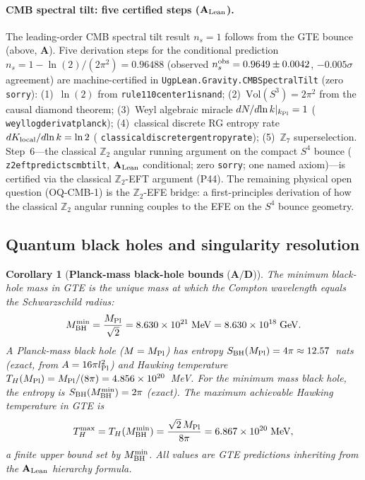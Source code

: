 \documentclass[11pt]{article}
\newtheorem{corollary}[theorem]{Corollary}
\theoremstyle{remark}
\newcommand{\ZS}{\mathbb{Z}_7}
\newcommand{\lean}[1]{%
  \penalty-100
  \begingroup\def\_{\textunderscore\allowbreak}\texttt{#1}\endgroup}
\newcommand{\CatA}{\textbf{A}}
\newcommand{\CatAL}{\ensuremath{\textbf{A}_{\rm Lean}}}
\newcommand{\CatAD}{\textbf{A/D}}
\begin{document}
\paragraph{CMB spectral tilt: five certified steps ($\CatAL$).}
The leading-order CMB spectral tilt result $n_s = 1$ follows from the GTE
bounce (above, $\CatA$).  Five derivation steps for the conditional prediction
$n_s = 1 - \ln(2)/(2\pi^2) = 0.96488$ (observed $n_s^{\rm obs}=0.9649\pm0.0042$,
$-0.005\sigma$ agreement) are machine-certified in
\lean{UgpLean.Gravity.CMBSpectralTilt} (zero \texttt{sorry}):
(1)~$\ln(2)$ from \lean{rule110\_center1\_is\_nand};
(2)~$\mathrm{Vol}(S^3)=2\pi^2$ from the causal diamond theorem;
(3)~Weyl algebraic miracle $dN/d\!\ln k|_{k_{\rm Pl}}=1$
(\lean{weyl\_log\_deriv\_at\_planck});
(4)~classical discrete RG entropy rate $dK_{\rm local}/d\!\ln k = \ln 2$
(\lean{classical\_discrete\_rg\_entropy\_rate});
(5)~$\ZS$ superselection.
Step~6---the classical $\mathbb{Z}_2$ angular running argument on the compact
$S^4$ bounce (\lean{z2\_eft\_predicts\_cmb\_tilt}, $\CatAL$ conditional;
zero \texttt{sorry}; one named axiom)---is certified via the classical
$\mathbb{Z}_2$-EFT argument (P44).  The remaining physical open question
(OQ-CMB-1) is the $\mathbb{Z}_2$-EFE bridge: a first-principles derivation
of how the classical $\mathbb{Z}_2$ angular running couples to the EFE on
the $S^4$ bounce geometry.


\subsection{Quantum black holes and singularity resolution}

\begin{corollary}[\textbf{Planck-mass black-hole bounds} ($\CatAD$)]
\label{cor:planck_bh}
The minimum black-hole mass in GTE is the unique mass at which the Compton
wavelength equals the Schwarzschild radius:
\begin{equation}
  M_{\rm BH}^{\rm min}
  = \frac{M_{\rm Pl}}{\sqrt{2}}
  = 8.630\times10^{21}\;\text{MeV} = 8.630\times10^{18}\;\text{GeV}.
  \label{eq:mbh_min}
\end{equation}
A Planck-mass black hole ($M=M_{\rm Pl}$) has entropy $S_{\rm BH}(M_{\rm
Pl})=4\pi\approx12.57$~nats (exact, from $A=16\pi l_{\rm Pl}^2$) and
Hawking temperature $T_H(M_{\rm Pl})=M_{\rm Pl}/(8\pi)=4.856\times10^{20}$~MeV.
For the minimum mass black hole, the entropy is $S_{\rm BH}(M_{\rm BH}^{\rm min})
=2\pi$ (exact).
The maximum achievable Hawking temperature in GTE is
\begin{equation}
  T_H^{\rm max}
  = T_H(M_{\rm BH}^{\rm min})
  = \frac{\sqrt{2}\,M_{\rm Pl}}{8\pi}
  = 6.867\times10^{20}\;\text{MeV},
  \label{eq:th_max}
\end{equation}
a finite upper bound set by $M_{\rm BH}^{\rm min}$.  All values are
GTE predictions inheriting from the $\CatAL$ hierarchy formula.
\end{corollary}
\end{document}
